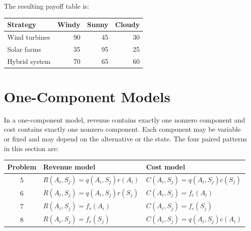 The resulting payoff table is:

\begin{center}
	\begin{tabular}{lrrr}
		\toprule
		Strategy & Windy & Sunny & Cloudy \\
		\midrule
		Wind turbines & 90 & 45 & 30 \\
		Solar farms & 35 & 95 & 25 \\
		Hybrid system & 70 & 65 & 60 \\
		\bottomrule
	\end{tabular}
\end{center}


\section{One-Component Models}
\label{sec:one-component-models}


\vspace{0.8cm}

In a one-component model, revenue contains exactly one nonzero component
and cost contains exactly one nonzero component. Each component may be
variable or fixed and may depend on the alternative or the state. The four paired patterns in this section are:

\begin{center}
	\small
	\begin{tabular}{cll}
		\toprule
		Problem & Revenue model & Cost model \\
		\midrule
		5
		& \(R(A_i,S_j)=q(A_i,S_j)r(A_i)\)
		& \(C(A_i,S_j)=q(A_i,S_j)c(S_j)\) \\
		
		6
		& \(R(A_i,S_j)=q(A_i,S_j)r(S_j)\)
		& \(C(A_i,S_j)=f_c(A_i)\) \\
		
		7
		& \(R(A_i,S_j)=f_r(A_i)\)
		& \(C(A_i,S_j)=f_c(S_j)\) \\
		
		8
		& \(R(A_i,S_j)=f_r(S_j)\)
		& \(C(A_i,S_j)=q(A_i,S_j)c(A_i)\) \\
		\bottomrule
	\end{tabular}
\end{center}


